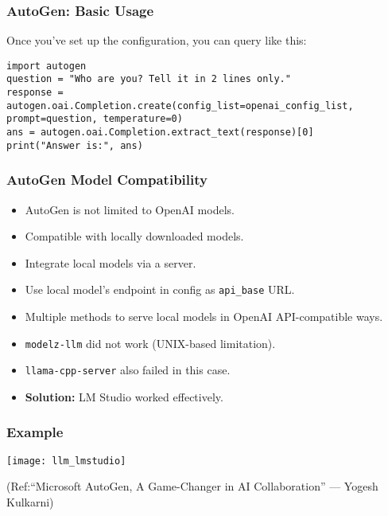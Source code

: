 \begin{frame}[fragile]\frametitle{AutoGen: Basic Usage}
Once you've set up the configuration, you can query like this:

\begin{lstlisting}
import autogen
question = "Who are you? Tell it in 2 lines only."
response = autogen.oai.Completion.create(config_list=openai_config_list, prompt=question, temperature=0)
ans = autogen.oai.Completion.extract_text(response)[0]
print("Answer is:", ans)
\end{lstlisting}
\end{frame}

\begin{frame}[fragile]\frametitle{AutoGen Model Compatibility}
    \begin{itemize}
        \item AutoGen is not limited to OpenAI models.
        \item Compatible with locally downloaded models.
        \item Integrate local models via a server.
        \item Use local model's endpoint in config as \texttt{api\_base} URL.
        \item Multiple methods to serve local models in OpenAI API-compatible ways.
        \item \texttt{modelz-llm} did not work (UNIX-based limitation).
        \item \texttt{llama-cpp-server} also failed in this case.
        \item \textbf{Solution:} LM Studio worked effectively.
    \end{itemize}
\end{frame}

\begin{frame}[fragile]\frametitle{Example}

	
	\begin{center}
	\texttt{[image: llm\_lmstudio]}
	\end{center}
	
{\tiny (Ref:``Microsoft AutoGen, A Game-Changer in AI Collaboration'' — Yogesh Kulkarni)}


\end{frame}




